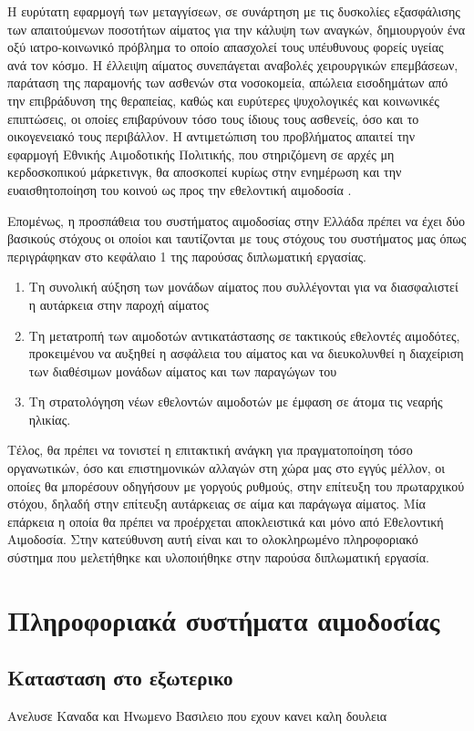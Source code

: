 Η ευρύτατη εφαρμογή των μεταγγίσεων, σε συνάρτηση με τις δυσκολίες εξασφάλισης των απαιτούμενων ποσοτήτων αίματος για την κάλυψη των αναγκών, δημιουργούν ένα οξύ ιατρο-κοινωνικό πρόβλημα το οποίο απασχολεί τους υπέυθυνους φορείς υγείας ανά τον κόσμο. Η έλλειψη αίματος συνεπάγεται αναβολές χειρουργικών επεμβάσεων, παράταση της παραμονής των ασθενών στα νοσοκομεία, απώλεια εισοδημάτων από την επιβράδυνση της θεραπείας, καθώς και ευρύτερες ψυχολογικές και κοινωνικές επιπτώσεις, οι οποίες επιβαρύνουν τόσο τους ίδιους τους ασθενείς, όσο και το οικογενειακό τους περιβάλλον. Η αντιμετώπιση του προβλήματος απαιτεί την εφαρμογή Εθνικής Αιμοδοτικής Πολιτικής, που στηριζόμενη σε αρχές μη κερδοσκοπικού μάρκετινγκ, θα αποσκοπεί κυρίως στην ενημέρωση και την ευαισθητοποίηση του κοινού ως προς την εθελοντική αιμοδοσία \cite{Politis}\cite{Marantidou2007}.

Επομένως, η προσπάθεια του συστήματος αιμοδοσίας στην Ελλάδα πρέπει να έχει δύο βασικούς στόχους οι οποίοι και ταυτίζονται με τους στόχους του συστήματος μας όπως περιγράφηκαν στο κεφάλαιο 1 της παρούσας διπλωματική εργασίας.
\begin{enumerate}
	\item Τη συνολική αύξηση των μονάδων αίματος που συλλέγονται για να διασφαλιστεί η αυτάρκεια στην παροχή αίματος 
	\item Τη μετατροπή των αιμοδοτών αντικατάστασης σε τακτικούς εθελοντές αιμοδότες, προκειμένου να αυξηθεί η ασφάλεια του αίματος και να διευκολυνθεί η διαχείριση των διαθέσιμων μονάδων αίματος και των παραγώγων του
	\item Τη στρατολόγηση νέων εθελοντών αιμοδοτών με έμφαση σε άτομα τις νεαρής ηλικίας.
\end{enumerate}

Τέλος, θα πρέπει να τονιστεί η επιτακτική ανάγκη για πραγματοποίηση τόσο οργανωτικών, όσο και επιστημονικών αλλαγών στη χώρα μας στο εγγύς μέλλον, οι οποίες θα μπορέσουν οδηγήσουν με γοργούς ρυθμούς, στην επίτευξη του πρωταρχικού στόχου, δηλαδή στην επίτευξη αυτάρκειας σε αίμα και παράγωγα αίματος. Μία επάρκεια η οποία θα πρέπει να προέρχεται αποκλειστικά και μόνο από Εθελοντική Αιμοδοσία. Στην κατεύθυνση αυτή είναι και το ολοκληρωμένο πληροφοριακό σύστημα που μελετήθηκε και υλοποιήθηκε στην παρούσα διπλωματική εργασία.

\section{Πληροφοριακά συστήματα αιμοδοσίας}
	\subsection{Κατασταση στο εξωτερικο}
		Ανελυσε Καναδα και Ηνωμενο Βασιλειο που εχουν κανει καλη δουλεια
